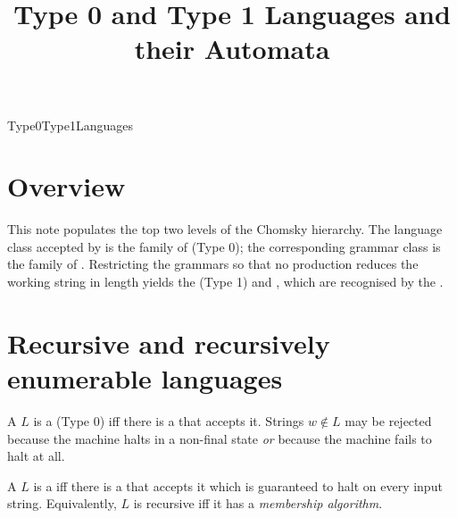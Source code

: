 \documentclass[hidelinks]{article}
\title{Type 0 and Type 1 Languages and their Automata}
\author{}
\date{}
\begin{document}
\maketitle

\begin{smodule}[title={Type 0 and Type 1 Languages and their Automata}]{Type0Type1Languages}


\section{Overview}

This note populates the top two levels of the Chomsky hierarchy. The language class accepted by  is the family of  (Type 0); the corresponding grammar class is the family of . Restricting the grammars so that no production reduces the working string in length yields the  (Type 1) and , which are recognised by the .

\section{Recursive and recursively enumerable languages}

\begin{sdefinition}[for=recursively enumerable language]
A  $L$ is a  (Type 0) iff there is a  that accepts it. Strings $w \notin L$ may be rejected because the machine halts in a non-final state \emph{or} because the machine fails to halt at all.
\end{sdefinition}

\begin{sdefinition}[for=recursive language]
A  $L$ is a  iff there is a  that accepts it which is guaranteed to halt on every input string. Equivalently, $L$ is recursive iff it has a \emph{membership algorithm}.
\end{sdefinition}


\end{smodule}
\end{document}
